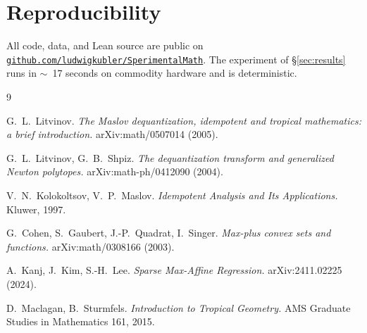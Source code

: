 \documentclass[11pt,a4paper]{article}
\begin{document}
\section*{Reproducibility}

All code, data, and Lean source are public on
\href{https://github.com/ludwigkubler/SperimentalMath}{\texttt{github.com/ludwigkubler/SperimentalMath}}.
The experiment of \S\ref{sec:results} runs in $\sim$~17 seconds on
commodity hardware and is deterministic.

\begin{thebibliography}{9}

G.~L.~Litvinov.
\emph{The Maslov dequantization, idempotent and tropical mathematics: a brief introduction.}
arXiv:math/0507014 (2005).

G.~L.~Litvinov, G.~B.~Shpiz.
\emph{The dequantization transform and generalized Newton polytopes.}
arXiv:math-ph/0412090 (2004).

V.~N.~Kolokoltsov, V.~P.~Maslov.
\emph{Idempotent Analysis and Its Applications.} Kluwer, 1997.

G.~Cohen, S.~Gaubert, J.-P.~Quadrat, I.~Singer.
\emph{Max-plus convex sets and functions.}
arXiv:math/0308166 (2003).

A.~Kanj, J.~Kim, S.-H.~Lee.
\emph{Sparse Max-Affine Regression.}
arXiv:2411.02225 (2024).

D.~Maclagan, B.~Sturmfels.
\emph{Introduction to Tropical Geometry.}
AMS Graduate Studies in Mathematics 161, 2015.

\end{thebibliography}
\end{document}
